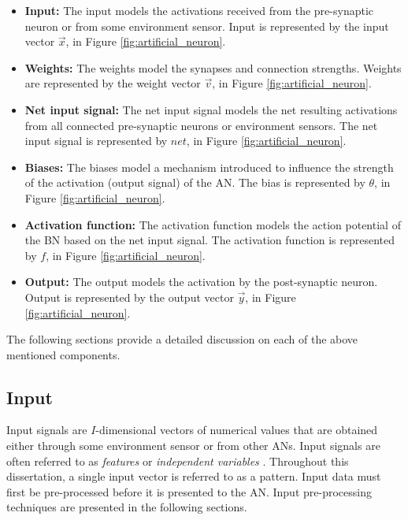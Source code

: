 \begin{itemize}
    \item \textbf{Input:} The input models the activations received from the pre-synaptic neuron or from some environment sensor. Input is represented by the input vector $\vec{x}$, in Figure \ref{fig:artificial_neuron}.

    \item \textbf{Weights:} The weights model the synapses and connection strengths. Weights are represented by the weight vector $\vec{v}$, in Figure \ref{fig:artificial_neuron}.

    \item {}\textbf{Net input signal:} The net input signal models the net resulting activations from all connected pre-synaptic neurons or environment sensors. The net input signal is represented by $net$, in Figure \ref{fig:artificial_neuron}.

    \item \textbf{Biases:} The biases model a mechanism introduced to influence the strength of the activation (output signal) of the \ac{AN}. The bias is represented by $\theta$, in Figure \ref{fig:artificial_neuron}.

    \item {}\textbf{Activation function:} The activation function models the action potential of the \ac{BN} based on the net input signal. The activation function is represented by $f$, in Figure \ref{fig:artificial_neuron}.

    \item \textbf{Output:} The output models the activation by the post-synaptic neuron. Output is represented by the output vector $\vec{y}$, in Figure \ref{fig:artificial_neuron}.
\end{itemize}

\noindent
The following sections provide a detailed discussion on each of the above mentioned components.


\subsection{Input}\label{sec:anns:an:input}

Input signals are $I$-dimensional vectors of numerical values that are obtained either through some environment sensor or from other \acp{AN}. Input signals are often referred to as \textit{features} or \textit{independent variables} \cite{ref:francis:2001}. Throughout this dissertation, a single input vector is referred to as a pattern. Input data must first be pre-processed before it is presented to the \ac{AN}. Input pre-processing techniques are presented in the following sections.


